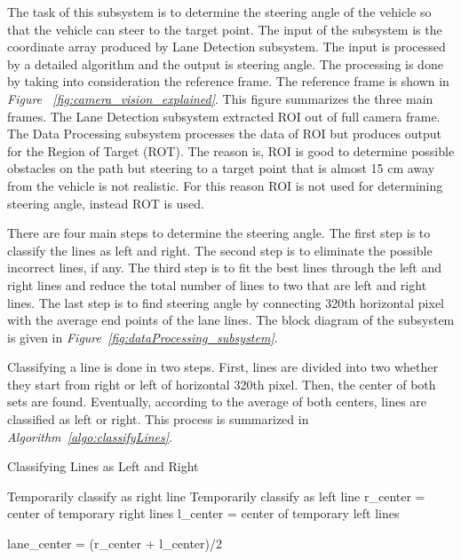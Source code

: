 \documentclass[a4paper,12pt]{article}
\begin{document}
\begin{enumerate}
			The task of this subsystem is to determine the steering angle of the vehicle so that the vehicle can steer to the target point. The input of the subsystem is the coordinate array produced by Lane Detection subsystem. The input is processed by a detailed algorithm and the output is steering angle. The processing is done by taking into consideration the reference frame. The reference frame is shown in \textit{Figure ~\ref{fig:camera_vision_explained}}. This figure summarizes the three main frames. The Lane Detection subsystem extracted ROI out of full camera frame. The Data Processing subsystem processes the data of ROI but produces output for the Region of Target (ROT). The reason is, ROI is good to determine possible obstacles on the path but steering to a target point that is almost 15 cm away from the vehicle is not realistic.  For this reason ROI is not used for determining steering angle, instead ROT is used.
			
			There are four main steps to determine the steering angle.  The first step is to classify the lines as left and right. The second step is to eliminate the possible incorrect lines, if any. The third step is to fit the best lines through the left and right lines and reduce the total number of lines to two that are left and right lines. The last step is to find steering angle by connecting 320th horizontal pixel with the average end points of the lane lines. The block diagram of the subsystem is given in \textit{Figure~\ref{fig:dataProcessing_subsystem}}.
			
			Classifying a line is done in two steps. First, lines are divided into two whether they start from right or left of horizontal 320th pixel. Then, the center of both sets are found. Eventually, according to the average of both centers, lines are classified as left or right. This process is summarized in \textit{Algorithm~\ref{algo:classifyLines}}.

\begin{algorithm}[H]
	\caption{Classifying Lines as Left and Right}
	\label{algo:classifyLines}
	\DontPrintSemicolon
	
	{ 
		{
			Temporarily classify as right line 
		}
		\Else
		{
			Temporarily classify as left line 
		}
	}
	r\_center = center of temporary right lines \;
	l\_center = center of temporary left lines \;
	
	lane\_center = (r\_center + l\_center)/2 \;


\end{algorithm}
\end{enumerate}
\end{document}

